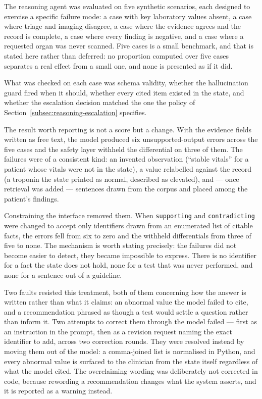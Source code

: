 The reasoning agent was evaluated on five synthetic scenarios, each designed to exercise a
specific failure mode: a case with key laboratory values absent, a case where triage and
imaging disagree, a case where the evidence agrees and the record is complete, a case where
every finding is negative, and a case where a requested organ was never scanned. Five cases is
a small benchmark, and that is stated here rather than deferred: no proportion computed over
five cases separates a real effect from a small one, and none is presented as if it did.

What was checked on each case was schema validity, whether the hallucination guard fired when
it should, whether every cited item existed in the state, and whether the escalation decision
matched the one the policy of Section~\ref{subsec:reasoning-escalation} specifies.

The result worth reporting is not a score but a change. With the evidence fields written as
free text, the model produced six unsupported-output errors across the five cases and the
safety layer withheld the differential on three of them. The failures were of a consistent
kind: an invented observation (``stable vitals'' for a patient whose vitals were not in the
state), a value relabelled against the record (a troponin the state printed as normal,
described as elevated), and --- once retrieval was added --- sentences drawn from the corpus
and placed among the patient's findings.

Constraining the interface removed them. When \texttt{supporting} and \texttt{contradicting}
were changed to accept only identifiers drawn from an enumerated list of citable facts, the
errors fell from six to zero and the withheld differentials from three of five to none. The
mechanism is worth stating precisely: the failures did not become easier to detect, they
became impossible to express. There is no identifier for a fact the state does not hold, none
for a test that was never performed, and none for a sentence out of a guideline.

Two faults resisted this treatment, both of them concerning how the answer is written rather
than what it claims: an abnormal value the model failed to cite, and a recommendation phrased
as though a test would settle a question rather than inform it. Two attempts to correct them
through the model failed --- first as an instruction in the prompt, then as a revision request
naming the exact identifier to add, across two correction rounds. They were resolved instead
by moving them out of the model: a comma-joined list is normalised in Python, and every
abnormal value is surfaced to the clinician from the state itself regardless of what the model
cited. The overclaiming wording was deliberately not corrected in code, because rewording a
recommendation changes what the system asserts, and it is reported as a warning instead.

